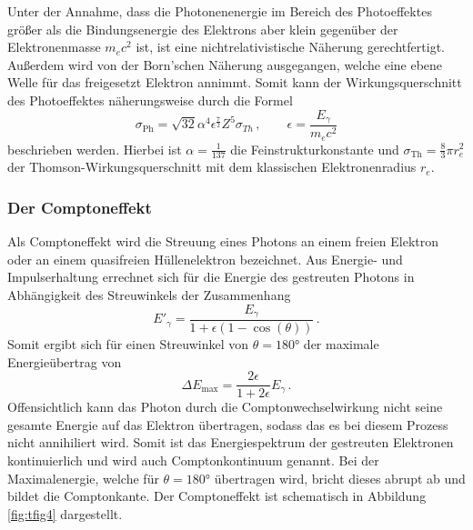 Unter der Annahme, dass die Photonenenergie im Bereich des Photoeffektes größer als die Bindungsenergie des Elektrons aber klein gegenüber der Elektronenmasse $m_ec^2$ ist, ist eine nichtrelativistische Näherung gerechtfertigt.
Außerdem wird von der Born'schen Näherung ausgegangen, welche eine ebene Welle für das freigesetzt Elektron annimmt.
Somit kann der Wirkungsquerschnitt des Photoeffektes näherungsweise durch die Formel \cite{quelle03}
\begin{equation}
\sigma_{\text{Ph}}=\sqrt{32}\alpha^4 \epsilon^\frac{7}{2}Z^5\sigma_{Th}\, , \qquad \epsilon = \frac{E_{\gamma}}{m_e c^2}
\end{equation}
beschrieben werden.
Hierbei ist $\alpha = \frac{1}{137}$ die Feinstrukturkonstante und $\sigma_{\text{Th}}=\frac{8}{3}\pi r_e^2$ der Thomson-Wirkungsquerschnitt mit dem klassischen Elektronenradius $r_e$.

\subsubsection*{Der Comptoneffekt}
Als Comptoneffekt wird die Streuung eines Photons an einem freien Elektron oder an einem quasifreien Hüllenelektron bezeichnet.
Aus Energie- und Impulserhaltung errechnet sich für die Energie des gestreuten Photons in Abhängigkeit des Streuwinkels der Zusammenhang
\begin{equation}
E'_{\gamma} = \frac{E_{\gamma}}{1 + \epsilon(1-\cos(\theta))} \, .
\end{equation}
Somit ergibt sich für einen Streuwinkel von $\theta = 180°$ der maximale Energieübertrag von
\begin{equation}
\Delta E_\text{max} = \frac{2\epsilon}{1 + 2 \epsilon} E_{\gamma} \, .
\end{equation}
Offensichtlich kann das Photon durch die Comptonwechselwirkung nicht seine gesamte Energie auf das Elektron übertragen, sodass das es bei diesem Prozess nicht annihiliert wird.
Somit ist das Energiespektrum der gestreuten Elektronen kontinuierlich und wird auch Comptonkontinuum genannt. 
Bei der Maximalenergie, welche für $\theta = 180°$ übertragen wird, bricht dieses abrupt ab und bildet die Comptonkante.
Der Comptoneffekt ist schematisch in Abbildung \ref{fig:tfig4} dargestellt.

